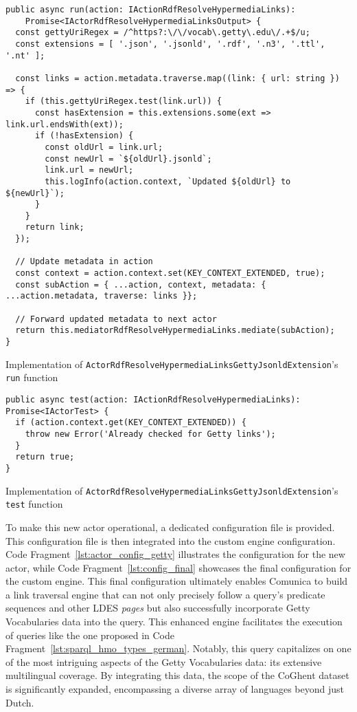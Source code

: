 \begin{listing}[htbp]
    \begin{verbatim}
public async run(action: IActionRdfResolveHypermediaLinks):
    Promise<IActorRdfResolveHypermediaLinksOutput> {
  const gettyUriRegex = /^https?:\/\/vocab\.getty\.edu\/.+$/u;
  const extensions = [ '.json', '.jsonld', '.rdf', '.n3', '.ttl', '.nt' ];
  
  const links = action.metadata.traverse.map((link: { url: string }) => {
    if (this.gettyUriRegex.test(link.url)) {
      const hasExtension = this.extensions.some(ext => link.url.endsWith(ext));
      if (!hasExtension) {
        const oldUrl = link.url;
        const newUrl = `${oldUrl}.jsonld`;
        link.url = newUrl;
        this.logInfo(action.context, `Updated ${oldUrl} to ${newUrl}`);
      }
    }
    return link;
  });
  
  // Update metadata in action
  const context = action.context.set(KEY_CONTEXT_EXTENDED, true);
  const subAction = { ...action, context, metadata: { ...action.metadata, traverse: links }};
  
  // Forward updated metadata to next actor
  return this.mediatorRdfResolveHypermediaLinks.mediate(subAction);
}
    \end{verbatim}
    \caption{Implementation of \texttt{ActorRdfResolveHypermediaLinksGettyJsonldExtension}'s \texttt{run} function}
    \label{lst:actor_getty_run}
\end{listing}

\begin{listing}[htbp]
    \begin{verbatim}
public async test(action: IActionRdfResolveHypermediaLinks): Promise<IActorTest> {
  if (action.context.get(KEY_CONTEXT_EXTENDED)) {
    throw new Error('Already checked for Getty links');
  }
  return true;
}
    \end{verbatim}
    \caption{Implementation of \texttt{ActorRdfResolveHypermediaLinksGettyJsonldExtension}'s \texttt{test} function}
    \label{lst:actor_getty_test}
\end{listing}

To make this new actor operational, a dedicated configuration file is provided. This configuration file is then integrated into the custom engine configuration. Code Fragment~\ref{lst:actor_config_getty} illustrates the configuration for the new actor, while Code Fragment~\ref{lst:config_final} showcases the final configuration for the custom engine. This final configuration ultimately enables Comunica to build a link traversal engine that can not only precisely follow a query's predicate sequences and other LDES \textit{pages} but also successfully incorporate Getty Vocabularies data into the query. This enhanced engine facilitates the execution of queries like the one proposed in Code Fragment~\ref{lst:sparql_hmo_types_german}. Notably, this query capitalizes on one of the most intriguing aspects of the Getty Vocabularies data: its extensive multilingual coverage. By integrating this data, the scope of the CoGhent dataset is significantly expanded, encompassing a diverse array of languages beyond just Dutch.

